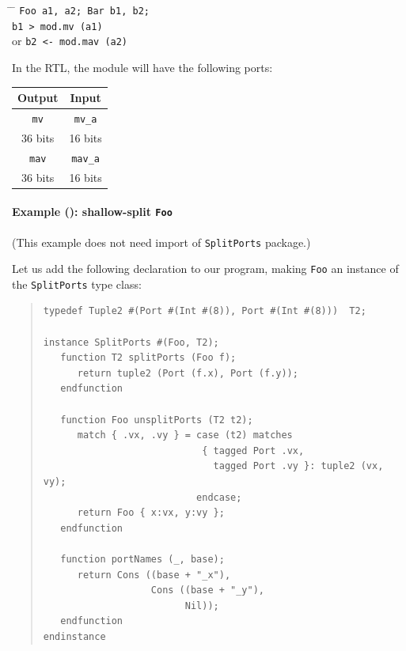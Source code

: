 \begin{tabbing}
\hspace*{4em} \= \hspace*{2em} \= \kill
\hspace*{4em} \>               \> {\tt Foo a1, a2; Bar b1, b2;} \\
              \>               \> {\tt b1  > mod.mv  (a1)} \\
              \>  or           \> {\tt b2 <- mod.mav (a2)}
\end{tabbing}

In the RTL, the module will have the following ports:

\begin{center}
  \begin{tabular}{|c||c|}
    \hline
     Output &
     Input  \\
    \hline
     {\tt mv}    &
     {\tt mv\_a} \\
     36 bits &
     16 bits \\
    \hline
     {\tt mav}    &
     {\tt mav\_a} \\
     36 bits &
     16 bits \\
    \hline
\end{tabular}
\end{center}


\paragraph{Example (\BSV): shallow-split {\tt Foo}}

\label{sec:splitports_examples_BSV_Foo_Shallow}

\hspace*{1em}

{\footnotesize (This example does not need import of {\tt SplitPorts} package.)}

Let us add the following declaration to our program, making {\tt Foo}
an instance of the {\tt SplitPorts} type class:

\begin{quote}
\begin{verbatim}
typedef Tuple2 #(Port #(Int #(8)), Port #(Int #(8)))  T2;

instance SplitPorts #(Foo, T2);
   function T2 splitPorts (Foo f);
      return tuple2 (Port (f.x), Port (f.y));
   endfunction

   function Foo unsplitPorts (T2 t2);
      match { .vx, .vy } = case (t2) matches
                            { tagged Port .vx,
                              tagged Port .vy }: tuple2 (vx, vy);
                           endcase;
      return Foo { x:vx, y:vy };
   endfunction

   function portNames (_, base);
      return Cons ((base + "_x"),
                   Cons ((base + "_y"),
                         Nil));
   endfunction
endinstance
\end{verbatim}
\end{quote}

